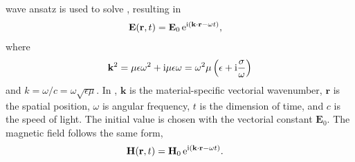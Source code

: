 wave ansatz is used to solve , resulting in
\begin{align}
  \mathbf{E} ( \mathbf{r}, t ) & = \mathbf{E}_0\, {\mathrm{e}}^{{\mathrm{i}} (\mathbf{k}
    \cdot \mathbf{r} - \omega t )},
  \label{eqn:planewaves}
\end{align}
where
\begin{equation}
  \mathbf{k}^2 = \mu \epsilon \omega^2 + {\mathrm{i}} \mu \epsilon \omega = \omega^2 \mu \left(\epsilon + {\mathrm{i}} \frac{\sigma}{\omega}\right)
  \label{eqn:planewavedispersion}
\end{equation}
and $k=\omega/c=\omega\sqrt{\epsilon\mu}$.  In ,
$\mathbf{k}$ is the material-specific vectorial wavenumber, $\mathbf{r}$ is the
spatial position, $\omega$ is angular frequency, $t$ is
the dimension of time, and $c$ is the speed of light.
The initial value is chosen with the vectorial constant $\mathbf{E}_0$.
The magnetic field follows the same form,
\begin{align}
  \mathbf{H} ( \mathbf{r}, t ) & = \mathbf{H}_0\, {\mathrm{e}}^{{\mathrm{i}} (\mathbf{k}
    \cdot \mathbf{r} - \omega t )}.
  \label{eqn:planewavesh}
\end{align}

